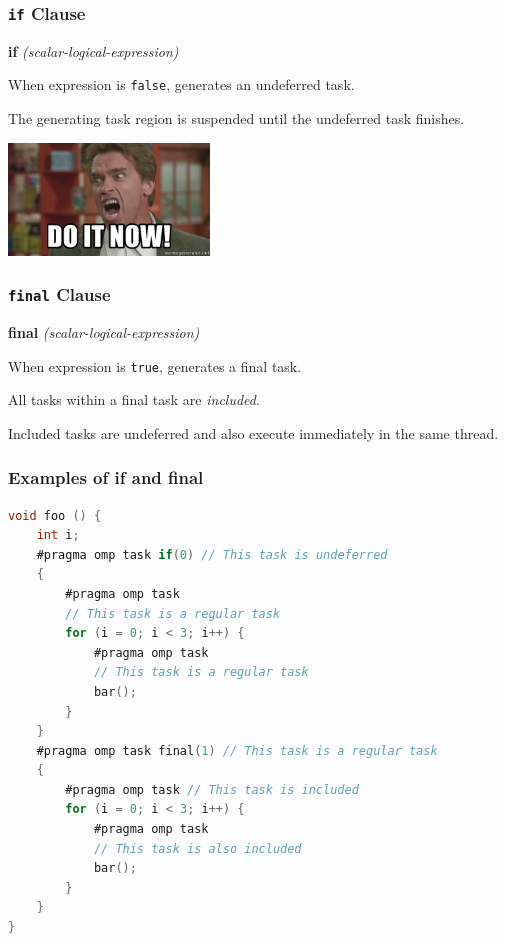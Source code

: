 \begin{frame}
\frametitle{{\tt if} Clause}

 \begin{center}
  {\bf if} {\it(scalar-logical-expression)}
  \end{center}
 
    When expression is {\tt false}, generates an \alert{undeferred task}.

The generating task region is suspended until the undeferred task finishes.

\begin{center}
\includegraphics[width=0.4\textwidth]{images/doitnow.jpeg}
\end{center}

\end{frame}

\begin{frame}
\frametitle{{\tt final} Clause}

  \begin{center}
  {\bf final} {\it(scalar-logical-expression)}
  \end{center}

    When expression is {\tt true}, generates a final task.
    
    All tasks within a final task are {\it included}.
    
    Included tasks are undeferred and also execute immediately in the same thread.

\end{frame}


\begin{frame}[fragile]
\frametitle{Examples of if and final}

  \begin{lstlisting}[language=C]
void foo () {
    int i;
    #pragma omp task if(0) // This task is undeferred
    {
        #pragma omp task
        // This task is a regular task
        for (i = 0; i < 3; i++) {
            #pragma omp task
            // This task is a regular task
            bar();
        }
    }
    #pragma omp task final(1) // This task is a regular task
    {
        #pragma omp task // This task is included
        for (i = 0; i < 3; i++) {
            #pragma omp task
            // This task is also included
            bar();
        }
    }
}
  \end{lstlisting}

\end{frame}


